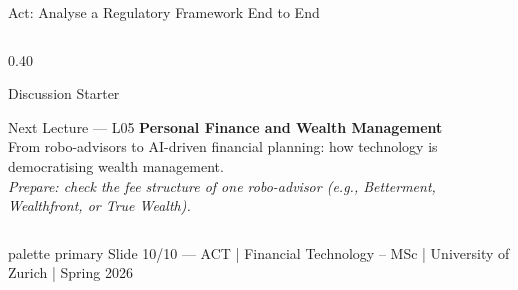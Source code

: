 \documentclass[aspectratio=169, 11pt]{beamer}
\newcommand{\bottomnote}[1]{%
  \vfill
  \begin{beamercolorbox}[wd=\textwidth,ht=2ex,dp=1ex]{palette primary}
    \tiny\hspace{1em}#1
  \end{beamercolorbox}}
\begin{document}
\begin{frame}{Act: Analyse a Regulatory Framework End to End}
\begin{columns}[T]
\begin{column}{0.40\textwidth}
\begin{exampleblock}{Discussion Starter}
\begin{itemize}
\end{itemize}
\end{exampleblock}
\vspace{0.2em}
\begin{alertblock}{Next Lecture --- L05}
\scriptsize \textbf{Personal Finance and Wealth Management}\\
From robo-advisors to AI-driven financial planning: how technology is democratising wealth management.\\[3pt]
\textit{Prepare: check the fee structure of one robo-advisor (e.g., Betterment, Wealthfront, or True Wealth).}
\end{alertblock}
\end{column}
\end{columns}

\bottomnote{Slide 10/10 --- ACT | Financial Technology -- MSc | University of Zurich | Spring 2026}
\end{frame}

\end{document}
